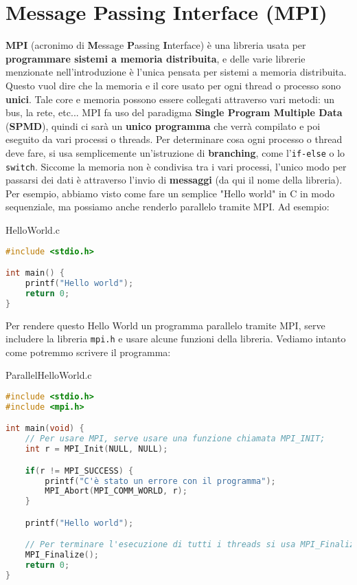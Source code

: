 \chapter{Message Passing Interface (MPI)}
\textbf{MPI} (acronimo di \textbf{M}essage \textbf{P}assing \textbf{I}nterface) è una libreria usata per \textbf{programmare sistemi a memoria distribuita}, e delle varie librerie menzionate nell'introduzione è l'unica pensata per sistemi a memoria distribuita. Questo vuol dire che la memoria e il core usato per ogni thread o processo sono \textbf{unici}. Tale core e memoria possono essere collegati attraverso vari metodi: un bus, la rete, etc...
\nwl
MPI fa uso del paradigma \textbf{Single Program Multiple Data} (\textbf{SPMD}), quindi ci sarà un \textbf{unico programma} che verrà compilato e poi eseguito da vari processi o threads. Per determinare cosa ogni processo o thread deve fare, si usa semplicemente un'istruzione di \textbf{branching}, come l'\texttt{if-else} o lo \texttt{switch}.
\nwl
Siccome la memoria non è condivisa tra i vari processi, l'unico modo per passarsi dei dati è attraverso l'invio di \textbf{messaggi} (da qui il nome della libreria). Per esempio, abbiamo visto come fare un semplice "Hello world" in C in modo sequenziale, ma possiamo anche renderlo parallelo tramite MPI. Ad esempio:
\begin{codeblock}{HelloWorld.c}
    \begin{lstlisting}[language = C]
#include <stdio.h>

int main() {
    printf("Hello world");
    return 0;
}\end{lstlisting}
\end{codeblock}
Per rendere questo Hello World un programma parallelo tramite MPI, serve includere la libreria \texttt{mpi.h} e usare alcune funzioni della libreria. Vediamo intanto come potremmo scrivere il programma:

\begin{codeblock}{ParallelHelloWorld.c}
    \begin{lstlisting}[language = C]
#include <stdio.h>
#include <mpi.h>

int main(void) {
    // Per usare MPI, serve usare una funzione chiamata MPI_INIT;
    int r = MPI_Init(NULL, NULL);

    if(r != MPI_SUCCESS) {
        printf("C'è stato un errore con il programma");
        MPI_Abort(MPI_COMM_WORLD, r);
    }

    printf("Hello world");

    // Per terminare l'esecuzione di tutti i threads si usa MPI_Finalize
    MPI_Finalize();
    return 0;
}\end{lstlisting}
\end{codeblock}

